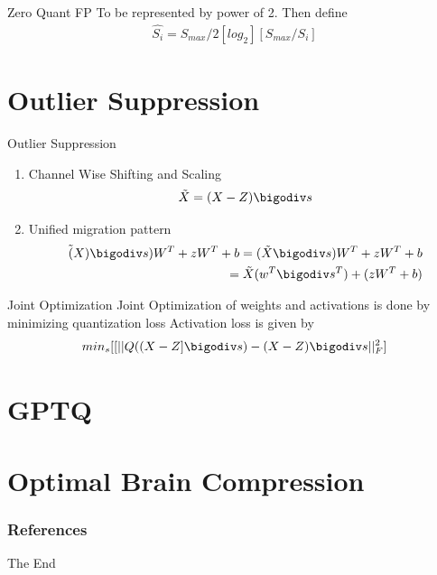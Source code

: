 \documentclass{beamer}
\theoremstyle{plain}
\theoremstyle{definition}
\theoremstyle{remark}
\numberwithin{equation}{section}
\numberwithin{figure}{section}
\numberwithin{theorem}{section}
\begin{document}
\begin{frame}{Zero Quant FP}
    To be represented by power of 2. Then define
    \begin{align}
    \hat{S_i} = S_{max}/2 [log_2][S_{max}/S_i]    
    \end{align}
\end{frame}
\section{Outlier Suppression}

\begin{frame}{Outlier Suppression}
\begin{enumerate}
    \item Channel Wise Shifting and  Scaling
    \begin{align}
        \Tilde{X} = (X - Z) \bigodiv s
    \end{align}
    \item Unified migration pattern
    \begin{align}
    \Tilde(X) \bigodiv s) W^T + zW^T + b = (\Tilde{X} \bigodiv s ) W^T + zW^T + b \\
    = \Tilde{X} (w^T \bigodiv s^T) + (zW^T + b)
    \end{align}
\end{enumerate}
\end{frame}

\begin{frame}{Joint Optimization}
Joint Optimization of weights and activations is done by minimizing quantization loss
Activation loss is given by
\begin{align}
    min_s[[||Q((X-Z]\bigodiv s) - (X-Z) \bigodiv s||^2_F]
\end{align}


    
\end{frame}

\section{GPTQ}
\section{Optimal Brain Compression}



\begin{frame}[t, allowframebreaks]
\frametitle{References}
%
%
\end{frame}


\begin{frame}
\Huge{\centerline{The End}}
\end{frame}

\end{document}
